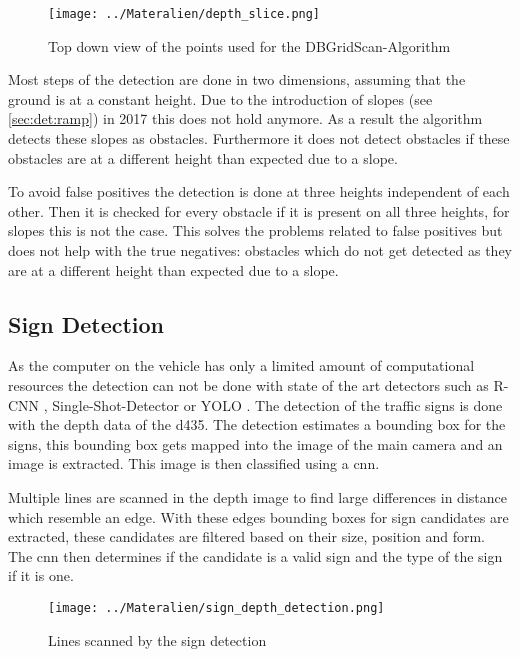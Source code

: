 \begin{figure}[h!]
    \centering
    \texttt{[image: ../Materalien/depth\_slice.png]}
    \caption{Top down view of the points used for the DBGridScan-Algorithm}
    \label{fig:det:dbtopdown}
\end{figure}

Most steps of the detection are done in two dimensions, assuming that the ground is at a constant height. 
Due to the introduction of slopes (see \ref{sec:det:ramp}) in 2017 this does not hold anymore. 
As a result the algorithm detects these slopes as obstacles. 
Furthermore it does not detect obstacles if these obstacles are at a different height than expected due to a slope.

To avoid false positives the detection is done at three heights independent of each other. 
Then it is checked for every obstacle if it is present on all three heights, for slopes this is not the case. 
This solves the problems related to false positives but does not help with the true negatives: obstacles which do not get detected as they are at a different height than expected due to a slope.

\subsection{Sign Detection}
As the computer on the vehicle has only a limited amount of computational resources the detection can not be done with state of the art detectors such as R-CNN \cite{rcnn}, Single-Shot-Detector \cite{ssd} or YOLO \cite{yolo}. The detection of the traffic signs is done with the depth data of the \ac{d435}. The detection estimates a bounding box for the signs, this bounding box gets mapped into the image of the main camera and an image is extracted. This image is then classified using a \ac{cnn}.

Multiple lines are scanned in the depth image to find large differences in distance which resemble an edge.
With these edges bounding boxes for sign candidates are extracted, these candidates are filtered based on their size, position and form. The \ac{cnn} then determines if the candidate is a valid sign and the type of the sign if it is one.

\begin{figure}[h]
    \centering
    \texttt{[image: ../Materalien/sign\_depth\_detection.png]}
    \caption{Lines scanned by the sign detection}
    \label{fig:det:signScan}
\end{figure}

